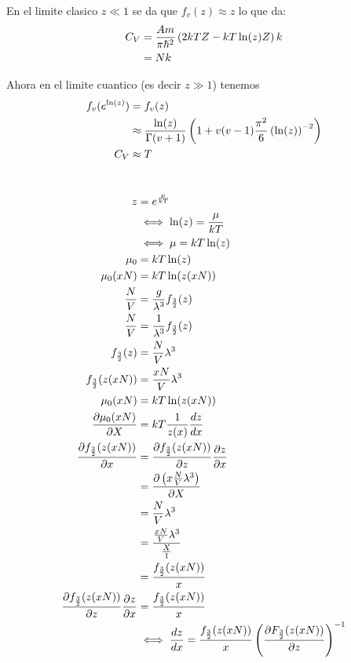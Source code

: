 \documentclass{report}
\begin{document}
En el limite clasico $z\ll 1$ se da que $f_v(z) \approx z$ lo que da:
\begin{align*}
  C_V &= \frac{Am}{\pi\hbar^2}\left(2kTZ - kT\ln(z)Z\right)k\\
  &= Nk
\end{align*}

Ahora en el limite cuantico (es decir $z \gg 1$) tenemos
\begin{align*}
  f_v(e^{\ln(z)}) &= f_v(z)\\
  &\approx \frac{\ln(z)}{\Gamma(v + 1)}\left(1 + v(v - 1)\frac{\pi^2}{6}\left(\ln(z)\right)^{-2}\right)\\
  C_V &\approx T
\end{align*}

\chapter{}

\section{}

\begin{align*}
  z &= e^{\frac{\mu}{kT}}\\
  &\iff \ln(z) = \frac{\mu}{kT}\\
  &\iff \mu = kT\ln(z)\\
  \mu_0 &= kT \ln(z)\\
  \mu_0(xN) &= kT \ln(z(xN))\\
  \frac{N}{V} &= \frac{g}{\lambda^3}f_{\frac{3}{2}}(z)\\
  \frac{N}{V} &= \frac{1}{\lambda^3}f_{\frac{3}{2}}(z)\\
  f_{\frac{3}{2}}(z) &= \frac{N}{V}\lambda^3\\
  f_{\frac{3}{2}}(z(xN)) &= \frac{xN}{V}\lambda^3\\
  \mu_0(xN) &= kT \ln (z (xN))\\
  \frac{\partial \mu_0(xN)}{\partial X} &= kT \frac{1}{z(x)} \frac{dz}{dx}\\
  \frac{\partial f_{\frac{3}{2}}(z(xN))}{\partial x} &= \frac{\partial f_{\frac{3}{2}}(z(xN))}{\partial z}\frac{\partial z}{\partial x}\\
  &= \frac{\partial \left(x \frac{N}{V}\lambda^3\right)}{\partial X}\\
  &= \frac{N}{V}\lambda^3\\
  &= \frac{\frac{xN}{V}\lambda^3}{\frac{X}{1}}\\
  &= \frac{f_{\frac{3}{2}}(z(xN))}{x}\\
  \frac{\partial f_{\frac{3}{2}}(z(xN))}{\partial z} \frac{\partial z}{\partial x} &= \frac{f_{\frac{3}{2}}(z (xN))}{x}\\
  &\iff \frac{dz}{dx} = \frac{f_{\frac{3}{2}}(z(xN))}{x}\left(\frac{\partial F_{\frac{3}{2}}(z(xN))}{\partial z}\right)^{-1}
\end{align*}
\end{document}
